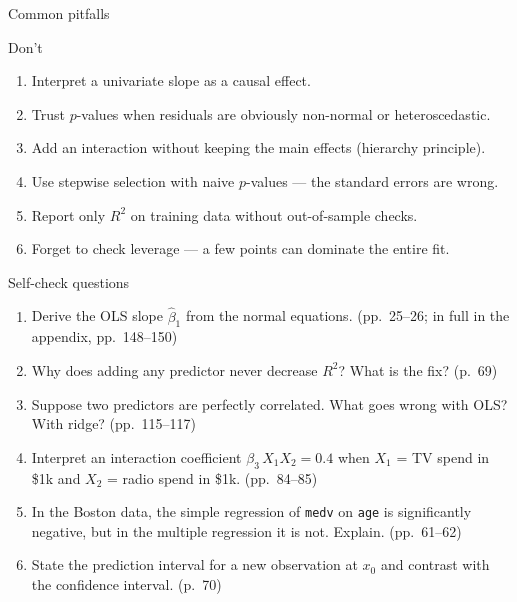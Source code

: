\documentclass[aspectratio=169,11pt]{beamer}
\begin{document}
\begin{frame}{Common pitfalls}
  \begin{alertblock}{Don't}
    \begin{enumerate}
      \item Interpret a univariate slope as a causal effect.
      \item Trust $p$-values when residuals are obviously non-normal or
            heteroscedastic.
      \item Add an interaction without keeping the main effects
            (hierarchy principle).
      \item Use stepwise selection with naive $p$-values --- the
            standard errors are wrong.
      \item Report only $R^2$ on training data without out-of-sample
            checks.
      \item Forget to check leverage --- a few points can dominate the
            entire fit.
    \end{enumerate}
  \end{alertblock}
\end{frame}

\begin{frame}{Self-check questions}
  \begin{enumerate}
    \item Derive the OLS slope $\hat\beta_1$ from the normal equations.
          (pp.~25--26; in full in the appendix, pp.~148--150)
    \item Why does adding any predictor never decrease $R^2$? What is
          the fix? (p.~69)
    \item Suppose two predictors are perfectly correlated. What goes
          wrong with OLS? With ridge? (pp.~115--117)
    \item Interpret an interaction coefficient
          $\beta_3\,X_1 X_2 = 0.4$ when $X_1$ = TV spend in \$1k and
          $X_2$ = radio spend in \$1k. (pp.~84--85)
    \item In the Boston data, the simple regression of \texttt{medv}
          on \texttt{age} is significantly negative, but in the
          multiple regression it is not. Explain. (pp.~61--62)
    \item State the prediction interval for a new observation at $x_0$
          and contrast with the confidence interval. (p.~70)
  \end{enumerate}
\end{frame}
\end{document}
